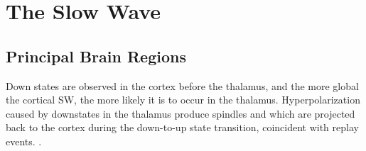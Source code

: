 

\section*{The Slow Wave}

\subsection*{Principal Brain Regions}
Down states are observed in the cortex before the thalamus, and the more global the cortical SW, the more likely it is to occur in the thalamus.
Hyperpolarization caused by downstates in the thalamus produce spindles and which are projected back to the cortex during the down-to-up state transition, coincident with replay events.
\citep{Mak-McCully2017}. 


